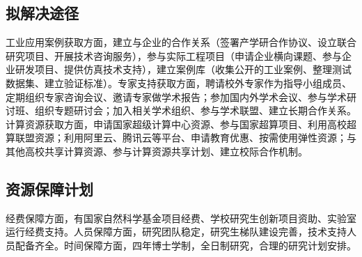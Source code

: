 \subsection{拟解决途径}

工业应用案例获取方面，建立与企业的合作关系（签署产学研合作协议、设立联合研究项目、开展技术咨询服务），参与实际工程项目（申请企业横向课题、参与企业研发项目、提供仿真技术支持），建立案例库（收集公开的工业案例、整理测试数据集、建立验证标准）。专家支持获取方面，聘请校外专家作为指导小组成员、定期组织专家咨询会议、邀请专家做学术报告；参加国内外学术会议、参与学术研讨班、组织专题研讨会；加入相关学术组织、参与学术联盟、建立长期合作关系。计算资源获取方面，申请国家超级计算中心资源、参与国家超算项目、利用高校超算联盟资源；利用阿里云、腾讯云等平台、申请教育优惠、按需使用弹性资源；与其他高校共享计算资源、参与计算资源共享计划、建立校际合作机制。

\subsection{资源保障计划}

经费保障方面，有国家自然科学基金项目经费、学校研究生创新项目资助、实验室运行经费支持。人员保障方面，研究团队稳定，研究生梯队建设完善，技术支持人员配备齐全。时间保障方面，四年博士学制，全日制研究，合理的研究计划安排。